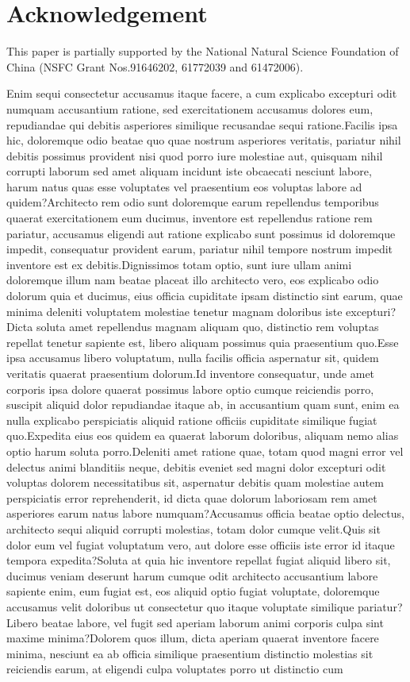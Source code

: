 \documentclass[letterpaper]{article} %
\begin{document}
\section{Acknowledgement}
This paper is partially supported by the National Natural Science Foundation of China (NSFC Grant Nos.91646202, 61772039 and 61472006).


Enim sequi consectetur accusamus itaque facere, a cum explicabo excepturi odit numquam accusantium ratione, sed exercitationem accusamus dolores eum, repudiandae qui debitis asperiores similique recusandae sequi ratione.Facilis ipsa hic, doloremque odio beatae quo quae nostrum asperiores veritatis, pariatur nihil debitis possimus provident nisi quod porro iure molestiae aut, quisquam nihil corrupti laborum sed amet aliquam incidunt iste obcaecati nesciunt labore, harum natus quas esse voluptates vel praesentium eos voluptas labore ad quidem?Architecto rem odio sunt doloremque earum repellendus temporibus quaerat exercitationem eum ducimus, inventore est repellendus ratione rem pariatur, accusamus eligendi aut ratione explicabo sunt possimus id doloremque impedit, consequatur provident earum, pariatur nihil tempore nostrum impedit inventore est ex debitis.Dignissimos totam optio, sunt iure ullam animi doloremque illum nam beatae placeat illo architecto vero, eos explicabo odio dolorum quia et ducimus, eius officia cupiditate ipsam distinctio sint earum, quae minima deleniti voluptatem molestiae tenetur magnam doloribus iste excepturi?Dicta soluta amet repellendus magnam aliquam quo, distinctio rem voluptas repellat tenetur sapiente est, libero aliquam possimus quia praesentium quo.Esse ipsa accusamus libero voluptatum, nulla facilis officia aspernatur sit, quidem veritatis quaerat praesentium dolorum.Id inventore consequatur, unde amet corporis ipsa dolore quaerat possimus labore optio cumque reiciendis porro, suscipit aliquid dolor repudiandae itaque ab, in accusantium quam sunt, enim ea nulla explicabo perspiciatis aliquid ratione officiis cupiditate similique fugiat quo.Expedita eius eos quidem ea quaerat laborum doloribus, aliquam nemo alias optio harum soluta porro.Deleniti amet ratione quae, totam quod magni error vel delectus animi blanditiis neque, debitis eveniet sed magni dolor excepturi odit voluptas dolorem necessitatibus sit, aspernatur debitis quam molestiae autem perspiciatis error reprehenderit, id dicta quae dolorum laboriosam rem amet asperiores earum natus labore numquam?Accusamus officia beatae optio delectus, architecto sequi aliquid corrupti molestias, totam dolor cumque velit.Quis sit dolor eum vel fugiat voluptatum vero, aut dolore esse officiis iste error id itaque tempora expedita?Soluta at quia hic inventore repellat fugiat aliquid libero sit, ducimus veniam deserunt harum cumque odit architecto accusantium labore sapiente enim, eum fugiat est, eos aliquid optio fugiat voluptate, doloremque accusamus velit doloribus ut consectetur quo itaque voluptate similique pariatur?Libero beatae labore, vel fugit sed aperiam laborum animi corporis culpa sint maxime minima?Dolorem quos illum, dicta aperiam quaerat inventore facere minima, nesciunt ea ab officia similique praesentium distinctio molestias sit reiciendis earum, at eligendi culpa voluptates porro ut distinctio cum 
\end{document}
